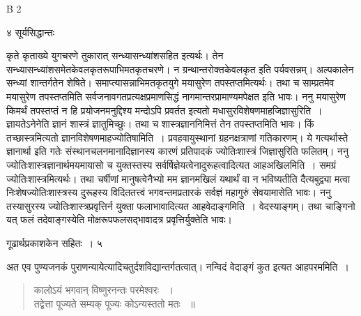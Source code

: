 \documentclass[11pt, openany]{book}
\begin{document}
{\tiny{B 2}}

\newpage


\noindent ४ \hspace{4cm} सूर्यसिद्धान्तः 
\vspace{1cm}
 

\noindent कृते कृताख्ये युगचरणे तुकारात् सन्ध्यासन्ध्यांशसहित इत्यर्थः। तेन सन्ध्यासन्ध्यांशसमेतकेवलकृतरूपाभिमतकृतचरणे। न ग्रन्थान्तरोक्तकेवलकृत इति पर्यवसन्नम्। अल्पकालेन सन्ध्यां शान्तर्गतेन शेषिते। समाप्त्यासन्नाभिमतकृतयुगे मयासुरेण तपस्तप्तमित्यर्थः। तथा च साम्प्रतमेव मयासुरेण तपस्तप्तमिति सर्वजनावगतप्रत्यक्षप्रमाणसिद्धं नागमान्तरप्रामाण्यमपेक्षत इति भावः। ननु मयासुरेण किमर्थं तपस्तप्तं न हि प्रयोजनमनुद्दिश्य मन्दोऽपि प्रवर्तत इत्यतो मधासुरविशेषणमाह\textendash जिज्ञासुरिति~। ज्ञायतेऽनेनेति ज्ञानं शास्त्रं ज्ञातुमिच्छुः। तथा च शास्त्रज्ञाननिमित्तं तेन तपस्तप्तमिति भावः। किं तच्छास्त्रमित्यतो ज्ञानविशेषणमाह\textendash ज्योतिषामिति~। प्रवहवायुस्थानां ग्रहनक्षत्राणां गतिकारणम्। ये गत्यर्थास्ते ज्ञानार्था इति गतेः संस्थानचलनमानादिज्ञानस्य कारणं प्रतिपादकं ज्योतिःशास्त्रं जिज्ञासुरिति फलितम्। ननु ज्योतिःशास्त्रज्ञानार्थमयमायासो च युक्तस्तस्य सर्वर्षिज्ञेयत्वेनादुरूहत्वादित्यत आह\textendash अखिलमिति~। समग्रं ज्योतिःशास्त्रमित्यर्थः। तथा चर्षीणां मानुषत्वेनैभ्यो मम ज्ञानमखिलं यथार्थं वा न भविष्यतीति दैत्यबुद्व्या मत्वा निःशेषज्योतिःशास्त्रस्य दुरूहस्य विदिततत्त्वं भगवन्तमप्रतारकं सर्वज्ञं महागुरुं सेवयामासेति भावः। ननु तस्यासुरस्य ज्योतिःशास्त्रप्रवृत्तिर्न युक्ता फलाभावादित्यत आह\textendash वेदाङ्गमिति~। वेदस्याङ्गम्। तथा चाङ्गिनो यत् फलं तदेवाङ्गस्येति मोक्षरूपफलसद्भावादत्र प्रवृत्तिर्युक्तेति भावः।

\newpage

 
 \hspace{3cm}गूढार्थप्रकाशकेन सहितः~।  \hfill ५
 \vspace{1cm}

\noindent अत एव पुण्यजनकं पुराणन्यायेत्यादिचतुर्दशविद्यान्तर्गतत्वात्। नन्विदं वेदाङ्गं कुत इत्यत आह\textendash परममिति~।


\begin{quote}
  {\ssi कालोऽयं भगवान् विष्णुरनन्तः परमेश्वरः ~।\\
तद्वेत्ता पूज्यते सम्यक् पूज्यः कोऽन्यस्ततो मतः ~॥}
\end{quote}
\end{document}
